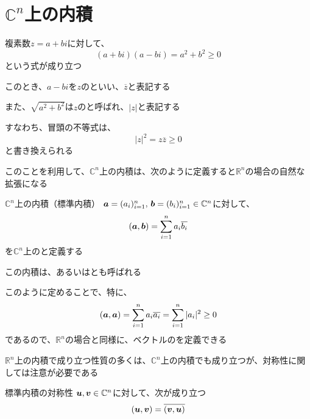\documentclass[../../../topic_linear-algebra]{subfiles}
\begin{document}
\sectionline
\section{$\mathbb{C}^n$上の内積}

複素数$z=a+bi$に対して、
\begin{equation*}
  (a+bi)(a-bi) = a^2 + b^2 \geq 0
\end{equation*}
という式が成り立つ

このとき、$a-bi$を$z$のといい、$\overline{z}$と表記する

また、$\sqrt{a^2 + b^2}$は$z$のと呼ばれ、$|z|$と表記する

\br

すなわち、冒頭の不等式は、
\begin{equation*}
  |z|^2 = z \overline{z} \geq 0
\end{equation*}
と書き換えられる

\br

このことを利用して、$\mathbb{C}^n$上の内積は、次のように定義すると$\mathbb{R}^n$の場合の自然な拡張になる

\begin{definition}{$\mathbb{C}^n$上の内積（標準内積）}\label{def:standard-inner-product-Cn}
  $\vb*{a} = (a_i)_{i=1}^n,\, \vb*{b} = (b_i)_{i=1}^n \in \mathbb{C}^n$に対して、
  \begin{equation*}
    (\vb*{a}, \vb*{b}) = \sum_{i=1}^n a_i \overline{b_i}
  \end{equation*}
  を$\mathbb{C}^n$上のと定義する

  この内積は、あるいはとも呼ばれる
\end{definition}

このように定めることで、特に、
\begin{equation*}
  (\vb*{a}, \vb*{a}) = \sum_{i=1}^n a_i \overline{a_i} = \sum_{i=1}^n |a_i|^2 \geq 0
\end{equation*}
であるので、$\mathbb{R}^n$の場合と同様に、ベクトルのを定義できる

\sectionline

$\mathbb{R}^n$上の内積で成り立つ性質の多くは、$\mathbb{C}^n$上の内積でも成り立つが、対称性に関しては注意が必要である

\begin{theorem}{標準内積の対称性}\label{thm:standard-inner-product-symmetry}
  $\vb*{u}, \vb*{v} \in \mathbb{C}^n$に対して、次が成り立つ
  \begin{equation*}
    (\vb*{u}, \vb*{v}) = \overline{(\vb*{v}, \vb*{u})}
  \end{equation*}
\end{theorem}
\end{document}
